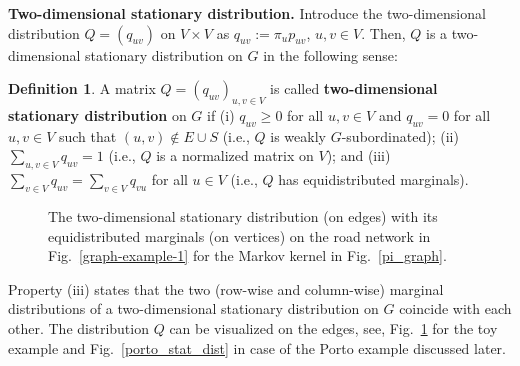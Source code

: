 \documentclass[b5paper,12pt]{report}
\theoremstyle{definition}
\newtheorem{definition}{Definition}
\begin{document}
\smallskip

\textbf{Two-dimensional stationary distribution.} Introduce the two-dimensional distribution $Q=(q_{uv})$ on $V\times V$ as $q_{uv}:=\pi_u p_{uv}$, $u,v\in V$. Then, $Q$ is a two-dimensional stationary distribution on $G$ in the following sense: 

\begin{definition}\label{two_stat}
A matrix $Q=(q_{uv})_{u,v\in V}$ is called \textbf{two-dimensional stationary distribution} on $G$ if (i) $q_{uv}\ge 0$ for all $u,v\in V$ and $q_{uv}=0$ for all $u,v\in V$ such that $(u, v)\notin E\cup S$ (i.e., $Q$ is weakly $G$-subordinated); (ii) $\sum_{u,v\in V}q_{uv} = 1$ (i.e., $Q$ is a normalized matrix on $V$); and (iii) $\sum_{v\in V} q_{uv} = \sum_{v\in V} q_{vu}$ for all $u\in V$ (i.e., $Q$ has equidistributed marginals). \end{definition}

\begin{figure}[t!]
\centering
{}
\caption{The two-dimensional stationary distribution (on edges) with its equidistributed marginals (on vertices) on the road network in Fig.~\ref{graph-example-1} for the Markov kernel in Fig.~\ref{pi_graph}.}
\label{2D_dist_toy}
\end{figure}

Property (iii) states that the two (row-wise and column-wise) marginal distributions of a two-dimensional stationary distribution on $G$ coincide with each other. The distribution $Q$ can be visualized on the edges, see, Fig.~\ref{2D_dist_toy} for the toy example and Fig.~\ref{porto_stat_dist} in case of the Porto example discussed later. 
\end{document}
